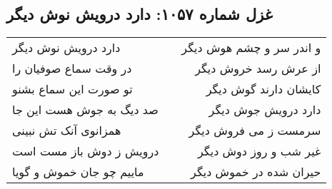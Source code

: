\begin{center}
\section*{غزل شماره ۱۰۵۷: دارد درویش نوش دیگر}
\label{sec:1057}
\begin{longtable}{l p{0.5cm} r}
دارد درویش نوش دیگر
&&
و اندر سر و چشم هوش دیگر
\\
در وقت سماع صوفیان را
&&
از عرش رسد خروش دیگر
\\
تو صورت این سماع بشنو
&&
کایشان دارند گوش دیگر
\\
صد دیگ به جوش هست این جا
&&
دارد درویش جوش دیگر
\\
همزانوی آنک تش نبینی
&&
سرمست ز می فروش دیگر
\\
درویش ز دوش باز مست است
&&
غیر شب و روز دوش دیگر
\\
ماییم چو جان خموش و گویا
&&
حیران شده در خموش دیگر
\\
\end{longtable}
\end{center}
